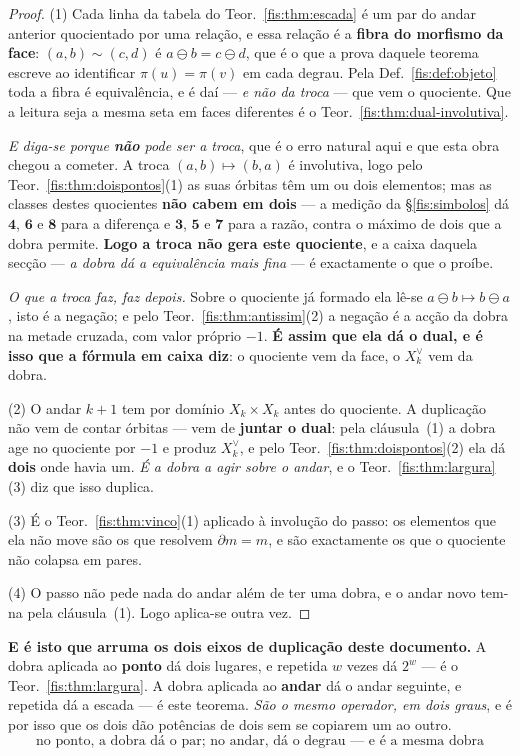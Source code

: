 \documentclass[livro.tex]{subfiles}
\begin{document}
\begin{proof}
(1) Cada linha da tabela do Teor.~\ref{fis:thm:escada} é um par do andar anterior
quocientado por uma relação, e essa relação é a \textbf{fibra do morfismo da
face}: $(a,b)\sim(c,d)$ é $a\ominus b=c\ominus d$, que é o que a prova daquele
teorema escreve ao identificar $\pi(u)=\pi(v)$ em cada degrau. Pela
Def.~\ref{fis:def:objeto} toda a fibra é equivalência, e é daí --- \emph{e não da
troca} --- que vem o quociente. Que a leitura seja a mesma seta em faces
diferentes é o Teor.~\ref{fis:thm:dual-involutiva}.

\emph{E diga-se porque \textbf{não} pode ser a troca}, que é o erro natural aqui
e que esta obra chegou a cometer. A troca $(a,b)\mapsto(b,a)$ é involutiva, logo
pelo Teor.~\ref{fis:thm:doispontos}(1) as suas órbitas têm um ou dois elementos;
mas as classes destes quocientes \textbf{não cabem em dois} --- a medição da
§\ref{fis:simbolos} dá $\mathbf{4}$, $\mathbf{6}$ e $\mathbf{8}$ para a diferença
e $\mathbf{3}$, $\mathbf{5}$ e $\mathbf{7}$ para a razão, contra o máximo de dois
que a dobra permite. \textbf{Logo a troca não gera este quociente}, e a caixa
daquela secção --- \emph{a dobra dá a equivalência mais fina} --- é exactamente o
que o proíbe.

\emph{O que a troca faz, faz depois.} Sobre o quociente já formado ela lê-se
$a\ominus b\mapsto b\ominus a$, isto é a negação; e pelo
Teor.~\ref{fis:thm:antissim}(2) a negação é a acção da dobra na metade cruzada,
com valor próprio $-1$. \textbf{É assim que ela dá o dual, e é isso que a fórmula
em caixa diz}: o quociente vem da face, o $X_k^{\vee}$ vem da dobra.

(2) O andar $k+1$ tem por domínio $X_k\times X_k$ antes do quociente. A
duplicação não vem de contar órbitas --- vem de \textbf{juntar o dual}: pela
cláusula~(1) a dobra age no quociente por $-1$ e produz $X_k^{\vee}$, e pelo
Teor.~\ref{fis:thm:doispontos}(2) ela dá \textbf{dois} onde havia um. \emph{É a
dobra a agir sobre o andar}, e o Teor.~\ref{fis:thm:largura}(3) diz que isso
duplica.

(3) É o Teor.~\ref{fis:thm:vinco}(1) aplicado à involução do passo: os elementos
que ela não move são os que resolvem $\partial m=m$, e são exactamente os que o
quociente não colapsa em pares.

(4) O passo não pede nada do andar além de ter uma dobra, e o andar novo tem-na
pela cláusula~(1). Logo aplica-se outra vez.
\end{proof}

\medskip\noindent\textbf{E é isto que arruma os dois eixos de duplicação deste
documento.} A dobra aplicada ao \textbf{ponto} dá dois lugares, e repetida $w$
vezes dá $2^{w}$ --- é o Teor.~\ref{fis:thm:largura}. A dobra aplicada ao
\textbf{andar} dá o andar seguinte, e repetida dá a escada --- é este teorema.
\emph{São o mesmo operador, em dois graus}, e é por isso que os dois dão
potências de dois sem se copiarem um ao outro.
\[
\boxed{\;\text{no ponto, a dobra dá o par; no andar, dá o degrau --- e é a mesma dobra}\;}
\]
\end{document}
